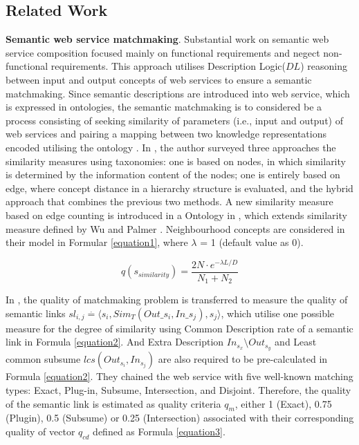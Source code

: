 \documentclass{llncs}
\begin{document}
\subsection{Related Work} \label{relatedWork}
\textbf{Semantic web service matchmaking}. Substantial work \cite{bansal2016generalized,mier2015integrated} on semantic web service composition focused mainly on functional requirements and negect non-functional requirements. This approach utilises Description Logic($DL$) \cite{baader2003description} reasoning between input and output concepts of web services to ensure a semantic matchmaking. Since semantic descriptions are introduced into web service, which is expressed in ontologies, the semantic matchmaking is to considered be a process consisting of seeking similarity of parameters (i.e., input and output) of web services and pairing a mapping between two knowledge representations encoded utilising the ontology \cite{lecue2006formal}. In \cite{shet2012new}, the author surveyed three approaches the similarity measures using taxonomies: one is based on nodes, in which similarity is determined by the information content of the nodes; one is entirely based on edge, where concept distance in a hierarchy structure is evaluated,  and the hybrid approach that combines the previous two methods. A new similarity measure based on edge counting is introduced in a Ontology in \cite{shet2012new}, which extends similarity measure defined by Wu and Palmer \cite{wu1994verbs}. Neighbourhood concepts are considered in their model in Formular \ref{equation1}, where $\lambda$ = 1 (default value as 0).

\begin{equation}
q(s_ {similarity}){=} \frac{2N \cdot e^{-\lambda L/D} }{N_{1}+N_{2}}
\label{equation1}
\end{equation}

In \cite{lecue2009optimizing}, the quality of matchmaking problem is transferred to measure the quality of semantic links $sl_{i,j} \stackrel{.}{=} \langle s_{i}, Sim_{T}(Out\_s_i,In\_s_j),s_{j}  \rangle$, which utilise one possible measure for the degree of similarity using Common Description rate of a semantic link in Formula \ref{equation2}. And Extra Description $In_{s_{x}} \setminus Out_{s_{y}}$ and Least common subsume $lcs(Out_{s_i},In_{s_j})$ are also required to be pre-calculated in Formula \ref{equation2}. They chained the web service with five well-known matching types: Exact, Plug-in, Subsume, Intersection, and Disjoint. Therefore, the quality of the semantic link is estimated as quality criteria $q_{m}$, either 1 (Exact), 0.75 (Plugin), 0.5 (Subsume) or 0.25 (Intersection) associated with their corresponding quality of vector $q_{cd}$ defined as Formula \ref{equation3}.
\end{document}

